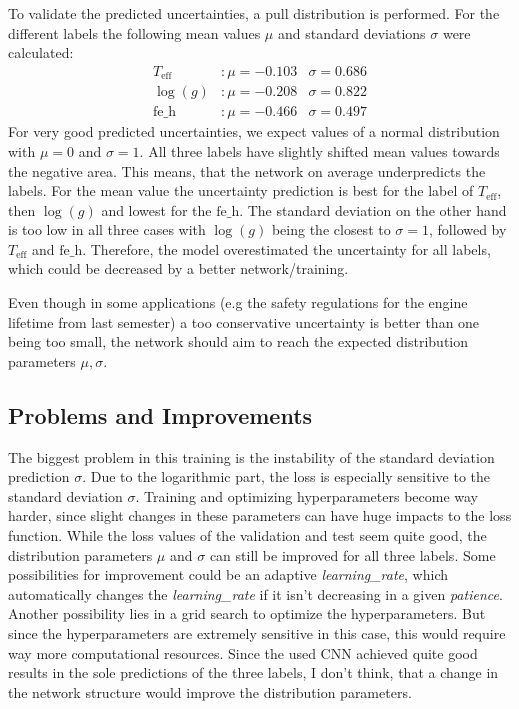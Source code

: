 To validate the predicted uncertainties, a pull distribution is performed. For the different labels the following mean values $\mu$ and standard deviations $\sigma$ were calculated:
\begin{align*}
  T_\text{eff} &: \mu = -0.103 &  \sigma = 0.686\\
  \log(g) &: \mu = -0.208 & \sigma = 0.822\\
  \text{fe\_h} &: \mu = -0.466 & \sigma = 0.497
\end{align*}
For very good predicted uncertainties, we expect values of a normal distribution with $\mu = 0$ and $\sigma = 1$.
All three labels have slightly shifted mean values towards the negative area. This means, that the network on average underpredicts the labels.
For the mean value the uncertainty prediction is best for the label of $T_\text{eff}$, then $\log(g)$ and lowest for the $\text{fe\_h}$.
The standard deviation on the other hand is too low in all three cases with $\log(g)$ being the closest to $\sigma=1$, followed by $T_\text{eff}$ and $\text{fe\_h}$.
Therefore, the model overestimated the uncertainty for all labels, which could be decreased by a better network/training.

Even though in some applications (e.g the safety regulations for the engine lifetime from last semester) a too conservative uncertainty is better than one being too small,
the network should aim to reach the expected distribution parameters $\mu, \sigma$.

\subsection{Problems and Improvements}
The biggest problem in this training is the instability of the standard deviation prediction $\sigma$. Due to the logarithmic part, the loss is especially sensitive to the standard deviation $\sigma$.
Training and optimizing hyperparameters become way harder, since slight changes in these parameters can have huge impacts to the loss function.
While the loss values of the validation and test seem quite good, the distribution parameters $\mu$ and $\sigma$ can still be improved for all three labels.
Some possibilities for improvement could be an adaptive \textit{learning\_rate}, which automatically changes the \textit{learning\_rate} if it isn't decreasing in a given \textit{patience}.
Another possibility lies in a grid search to optimize the hyperparameters. But since the hyperparameters are extremely sensitive in this case, this would require way more computational resources.
Since the used CNN achieved quite good results in the sole predictions of the three labels, I don't think, that a change in the network structure would improve the distribution parameters.

